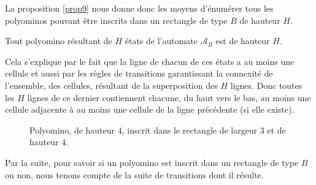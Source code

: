 La proposition \ref{prop9} nous donne donc les moyens d’énumérer tous les polyominos pouvant être inscrits dans un rectangle de type $B$ de hauteur $H$.
\begin{Lem}\label{lem1}
Tout  polyomino  résultant  de  $H$  états de l'automate $\mathcal{A}_{B}$ est de hauteur $H$.
\end{Lem}
\begin{Pre}
Cela s'explique par le fait que  la ligne de chacun de ces états  a au moins une cellule et aussi par les règles de transitions  garantissant la connexité de l'ensemble, des cellules, résultant de la superposition des $H$ lignes. Donc toutes les $H$ lignes de ce dernier contiennent chacune, du haut vers le bas, au moins une cellule adjacente à au moins une cellule de la ligne précédente (si elle existe).
\end{Pre}
\begin{figure}[!htb]
\begin{minipage}[c]{.46\linewidth}
        \centering
\end{minipage}\hfill
\begin{minipage}[c]{.56\linewidth}
        \centering
\begin{logicpuzzle}[rows=4,columns=3,color=cyan!100, width=750px,scale=0.5]
\framepuzzle[black!50]
\end{logicpuzzle}
\end{minipage}
\caption{Polyomino, de hauteur $4$, inscrit dans le rectangle de largeur $3$ et de hauteur $4$\label{Atfig11}.}
\end{figure} 
Par la suite, pour savoir si un polyomino est inscrit dans un rectangle de type $B$ ou non, nous tenons  compte de la suite de transitions dont il résulte.

